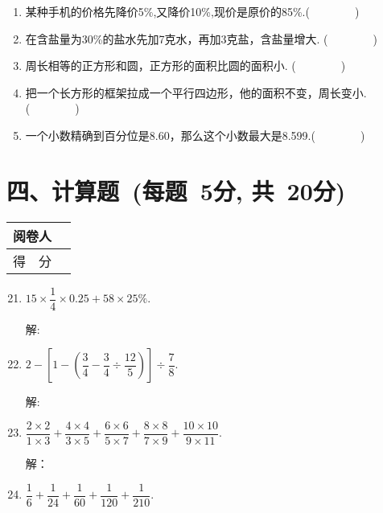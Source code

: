 \documentclass[twocolumn,landscape,UTF8]{ctexart}
\newcommand{\putzdx}{\marginpar{
		\parbox{1cm}{\vspace{-1.6cm}
			\rotatebox[origin=c]{90}{
				\usebox{\zdx}
		}}
}}
\begin{document}
\begin{spacing}{1.3}
\begin{enumerate}
\item 某种手机的价格先降价5\%,又降价10\%,现价是原价的85\%.\hfill(~~~~~~~~)
\item 在含盐量为30\%的盐水先加7克水，再加3克盐，含盐量增大. \hfill(~~~~~~~~)
\item 周长相等的正方形和圆，正方形的面积比圆的面积小. \hfill(~~~~~~~~)
\item 把一个长方形的框架拉成一个平行四边形，他的面积不变，周长变小.\hfill(~~~~~~~~)
\item 一个小数精确到百分位是8.60，那么这个小数最大是8.599.\hfill(~~~~~~~~)		
\end{enumerate}

\newpage
		\putzdx %
		
		\section*{\hspace{5cm} 四、计算题~(每题~5分, 共~20分)}
		\vspace{-2cm}
		\begin{tabular}{|p{}|p{}|}
			\hline
			\centering  阅卷人&  \\
			\hline
			\centering 得~~分 &  \\
			\hline
		\end{tabular}
		\begin{enumerate}\setcounter{enumi}{20}
		
        \item $15\times\dfrac{1}{4}\times0.25+58\times25\%$.


		解:
        \vspace{2.5cm}

        \item  $2-[1-(\dfrac{3}{4}-\dfrac{3}{4}\div\dfrac{12}{5})]\div\dfrac{7}{8}$.


		解:
        \vspace{2.5cm}


        \item $\dfrac{2\times2}{1\times3}+\dfrac{4\times4}{3\times5}+\dfrac{6\times6}{5\times7}+\dfrac{8\times8}{7\times9}+\dfrac{10\times10}{9\times11}$.
			
        解：
        \vspace{2.5cm} 
        
         \item $\dfrac{1}{6}+\dfrac{1}{24}+\dfrac{1}{60}+\dfrac{1}{120}+\dfrac{1}{210}$.
			

\end{enumerate}
\end{spacing}
\end{document}
